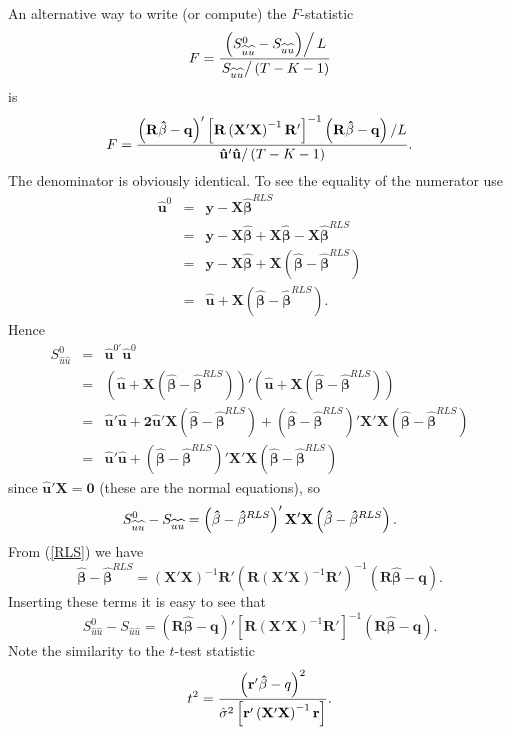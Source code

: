 \documentclass{article}
\begin{document}
An alternative way to write (or compute) the $F$-statistic
\[
F=\frac{\left. \left( S_{\widehat{u}\widehat{u}}^{0}-S_{\widehat{u}\widehat{u%
}}\right) \right/ L}{\left. S_{\widehat{u}\widehat{u}}\right/ \left(
T-K-1\right) } 
\]
is
\[
F=\frac{\left( \mathbf{R\hat{\beta}}-\mathbf{q}\right) '\left[ 
\mathbf{R}\left( \mathbf{X}'\mathbf{X}\right) ^{-1}\mathbf{R}%
'\right] ^{-1}\left( \mathbf{R\hat{\beta}}-\mathbf{q}\right) /L}{%
\mathbf{\hat{u}}'\mathbf{\hat{u}}/\left( T-K-1\right) }. 
\]%
The denominator is obviously identical. To see the equality of the numerator
use
\begin{eqnarray*}
\mathbf{\hat{u}}^{0} &=&\mathbf{y}-\mathbf{X\hat{\beta}}^{RLS} \\
&=&\mathbf{y-X\mathbf{\hat{\beta}+}X\hat{\beta}}-\mathbf{X\hat{\beta}}^{RLS}\\
&=&\mathbf{y-X\mathbf{\hat{\beta}+}X}\left( \mathbf{\hat{\beta}}-\mathbf{\hat{\beta}}^{RLS}\right) \\
&=&\mathbf{\hat{u}+X}\left( \mathbf{\hat{\beta}}-\mathbf{\hat{\beta}}^{RLS}\right) .
\end{eqnarray*}
Hence
\begin{eqnarray*}
S_{\widehat{u}\widehat{u}}^{0} &=&\mathbf{\hat{u}}^{0\prime }\mathbf{\hat{u}}^{0} \\
&=&\left( \mathbf{\hat{u}+X}\left( \mathbf{\hat{\beta}}
-\mathbf{\hat{\beta}}^{RLS}\right) \right) '\left( \mathbf{\hat{u}+X}
\left( \mathbf{\hat{\beta}}-\mathbf{\hat{\beta}}^{RLS}\right) \right) \\
&=&\mathbf{\hat{u}}'\mathbf{\hat{u}+2\hat{u}}'\mathbf{X}%
\left( \mathbf{\hat{\beta}}-\mathbf{\hat{\beta}}^{RLS}\right) +\left( 
\mathbf{\hat{\beta}}-\mathbf{\hat{\beta}}^{RLS}\right) '\mathbf{X}%
'\mathbf{X}\left( \mathbf{\hat{\beta}}-\mathbf{\hat{\beta}}%
^{RLS}\right) \\
&=&\mathbf{\hat{u}}'\mathbf{\hat{u}+}\left( \mathbf{\hat{\beta}}-%
\mathbf{\hat{\beta}}^{RLS}\right) '\mathbf{X}'\mathbf{X}%
\left( \mathbf{\hat{\beta}}-\mathbf{\hat{\beta}}^{RLS}\right)
\end{eqnarray*}%
since $\mathbf{\hat{u}}'\mathbf{X=0}$ (these are the normal
equations), so
\[ S_{\widehat{u}\widehat{u}}^{0}-S_{\widehat{u}\widehat{u}}=\left( \mathbf{%
\hat{\beta}}-\mathbf{\hat{\beta}}^{RLS}\right) '\mathbf{X}'%
\mathbf{X}\left( \mathbf{\hat{\beta}}-\mathbf{\hat{\beta}}^{RLS}\right) . \]
From (\ref{RLS}) we have
\[\mathbf{\hat{\beta}}-\mathbf{\hat{\beta}}^{RLS}=\left( \mathbf{X}'%
\mathbf{X}\right) ^{-1}\mathbf{\mathbf{R}'}\left( \mathbf{R}\left( 
\mathbf{X}'\mathbf{X}\right) ^{-1}\mathbf{\mathbf{R}'}%
\right) ^{-1}\left( \mathbf{R\hat{\beta}-q}\right) . \]
Inserting these terms it is easy to see that 
\[S_{\widehat{u}\widehat{u}}^{0}-S_{\widehat{u}\widehat{u}}=\left( \mathbf{R%
\hat{\beta}}-\mathbf{q}\right) '\left[ \mathbf{R}\left( \mathbf{X}%
'\mathbf{X}\right) ^{-1}\mathbf{R}'\right] ^{-1}\left( 
\mathbf{R\hat{\beta}}-\mathbf{q}\right) . \]
Note the similarity to the $t$-test statistic
\begin{equation*}
t^{2}=\frac{\left( \mathbf{r}'\mathbf{\hat{\beta}}-q\right) ^{2}}{%
\hat{\sigma}^{2}\left[ \mathbf{r}'\left( \mathbf{X}'%
\mathbf{X}\right) ^{-1}\mathbf{r}\right] }.
\end{equation*}
\end{document}
